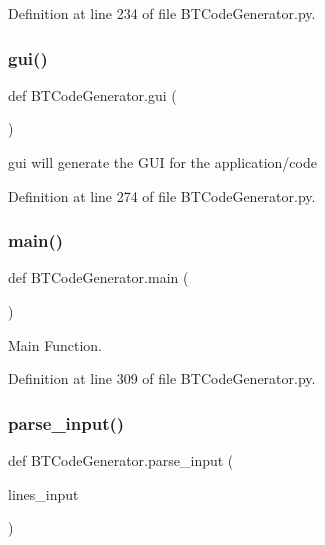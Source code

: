 Definition at line 234 of file B\+T\+Code\+Generator.\+py.

\mbox{\label{namespace_b_t_code_generator_a10876a9127f1dad77758153042f26dc9}} 
\subsubsection{\texorpdfstring{gui()}{gui()}}
{\footnotesize\ttfamily def B\+T\+Code\+Generator.\+gui (\begin{DoxyParamCaption}{ }\end{DoxyParamCaption})}



\textquotesingle{}gui\textquotesingle{} will generate the G\+UI for the application/code 



Definition at line 274 of file B\+T\+Code\+Generator.\+py.

\mbox{\label{namespace_b_t_code_generator_a6f3ec802a945edfd8094611d24abeb16}} 
\subsubsection{\texorpdfstring{main()}{main()}}
{\footnotesize\ttfamily def B\+T\+Code\+Generator.\+main (\begin{DoxyParamCaption}{ }\end{DoxyParamCaption})}



Main Function. 



Definition at line 309 of file B\+T\+Code\+Generator.\+py.

\mbox{\label{namespace_b_t_code_generator_afa9a33478ecf1013272426bffb04e651}} 
\subsubsection{\texorpdfstring{parse\_input()}{parse\_input()}}
{\footnotesize\ttfamily def B\+T\+Code\+Generator.\+parse\+\_\+input (\begin{DoxyParamCaption}\item[{}]{lines\+\_\+input }\end{DoxyParamCaption})}



